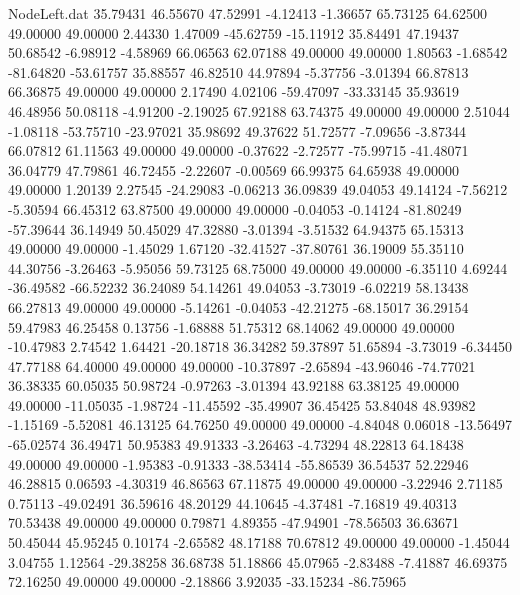 \begin{filecontents}{NodeLeft.dat}
  35.79431   46.55670   47.52991    -4.12413   -1.36657   65.73125   64.62500   49.00000   49.00000    2.44330    1.47009  -45.62759  -15.11912
  35.84491   47.19437   50.68542    -6.98912   -4.58969   66.06563   62.07188   49.00000   49.00000    1.80563   -1.68542  -81.64820  -53.61757
  35.88557   46.82510   44.97894    -5.37756   -3.01394   66.87813   66.36875   49.00000   49.00000    2.17490    4.02106  -59.47097  -33.33145
  35.93619   46.48956   50.08118    -4.91200   -2.19025   67.92188   63.74375   49.00000   49.00000    2.51044   -1.08118  -53.75710  -23.97021
  35.98692   49.37622   51.72577    -7.09656   -3.87344   66.07812   61.11563   49.00000   49.00000   -0.37622   -2.72577  -75.99715  -41.48071
  36.04779   47.79861   46.72455    -2.22607   -0.00569   66.99375   64.65938   49.00000   49.00000    1.20139    2.27545  -24.29083   -0.06213
  36.09839   49.04053   49.14124    -7.56212   -5.30594   66.45312   63.87500   49.00000   49.00000   -0.04053   -0.14124  -81.80249  -57.39644
  36.14949   50.45029   47.32880    -3.01394   -3.51532   64.94375   65.15313   49.00000   49.00000   -1.45029    1.67120  -32.41527  -37.80761
  36.19009   55.35110   44.30756    -3.26463   -5.95056   59.73125   68.75000   49.00000   49.00000   -6.35110    4.69244  -36.49582  -66.52232
  36.24089   54.14261   49.04053    -3.73019   -6.02219   58.13438   66.27813   49.00000   49.00000   -5.14261   -0.04053  -42.21275  -68.15017
  36.29154   59.47983   46.25458     0.13756   -1.68888   51.75312   68.14062   49.00000   49.00000  -10.47983    2.74542    1.64421  -20.18718
  36.34282   59.37897   51.65894    -3.73019   -6.34450   47.77188   64.40000   49.00000   49.00000  -10.37897   -2.65894  -43.96046  -74.77021
  36.38335   60.05035   50.98724    -0.97263   -3.01394   43.92188   63.38125   49.00000   49.00000  -11.05035   -1.98724  -11.45592  -35.49907
  36.45425   53.84048   48.93982    -1.15169   -5.52081   46.13125   64.76250   49.00000   49.00000   -4.84048    0.06018  -13.56497  -65.02574
  36.49471   50.95383   49.91333    -3.26463   -4.73294   48.22813   64.18438   49.00000   49.00000   -1.95383   -0.91333  -38.53414  -55.86539
  36.54537   52.22946   46.28815     0.06593   -4.30319   46.86563   67.11875   49.00000   49.00000   -3.22946    2.71185    0.75113  -49.02491
  36.59616   48.20129   44.10645    -4.37481   -7.16819   49.40313   70.53438   49.00000   49.00000    0.79871    4.89355  -47.94901  -78.56503
  36.63671   50.45044   45.95245     0.10174   -2.65582   48.17188   70.67812   49.00000   49.00000   -1.45044    3.04755    1.12564  -29.38258
  36.68738   51.18866   45.07965    -2.83488   -7.41887   46.69375   72.16250   49.00000   49.00000   -2.18866    3.92035  -33.15234  -86.75965

\end{filecontents}
